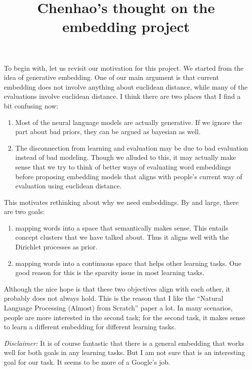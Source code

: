 \documentclass[letterpaper]{article}
\title{
Chenhao's thought on the embedding project
}
\begin{document}
\maketitle

To begin with, let us revisit our motivation for this project. We started from the idea of generative embedding.
One of our main argument is that current embedding does not involve anything about euclidean distance, while many of the evaluations involve euclidean distance.
I think there are two places that I find a bit confusing now:

\begin{enumerate}
\item Most of the neural language models are actually generative. If we ignore the part about bad priors, they can be argued as bayesian as well.
\item The disconnection from learning and evaluation may be due to bad evaluation instead of bad modeling. Though we alluded to this, it may actually make sense that we try to think of better ways of evaluating word embeddings before proposing embedding models that aligns with people's current way of evaluation using euclidean distance.
\end{enumerate}

This motivates rethinking about why we need embeddings.
By and large, there are two goals:
\begin{enumerate}
\item mapping words into a space that semantically makes sense.
This entails concept clusters that we have talked about. Thus it aligns well with the Dirichlet processes as prior.
\item mapping words into a continuous space that helps other learning tasks. One good reason for this is the sparsity issue in most learning tasks.
\end{enumerate}

Although the nice hope is that these two objectives align with each other, it probably does not always hold.
This is the reason that I like the ``Natural Language Processing (Almost) from Scratch'' paper a lot. In many scenarios, people are more interested in the second task; for the second task, it makes sense to learn a different embedding for different learning tasks.

{\em Disclaimer:} It is of course fantastic that there is a general embedding that works well for both goals in any learning tasks. But I am not sure that is an interesting goal for our task. It seems to be more of a Google's job.
\end{document}
